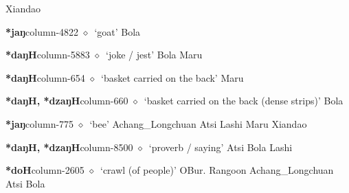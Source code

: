 \hspace{1ex}
         Xiandao 
  \item {\footnotesize \textbf{*jaŋ}}{\tiny column-4822}
         $\diamond$~`goat'
         Bola 
  \item {\footnotesize \textbf{*daŋH}}{\tiny column-5883}
         $\diamond$~`joke / jest'
         Bola 
\hspace{1ex}
         Maru 
  \item {\footnotesize \textbf{*daŋH}}{\tiny column-654}
         $\diamond$~`basket carried on the back'
         Maru 
  \item {\footnotesize \textbf{*daŋH, *dzaŋH}}{\tiny column-660}
         $\diamond$~`basket carried on the back (dense strips)'
         Bola 
  \item {\footnotesize \textbf{*jaŋ}}{\tiny column-775}
         $\diamond$~`bee'
         Achang\_Longchuan 
\hspace{1ex}
         Atsi 
\hspace{1ex}
         Lashi 
\hspace{1ex}
         Maru 
\hspace{1ex}
         Xiandao 
  \item {\footnotesize \textbf{*daŋH, *dzaŋH}}{\tiny column-8500}
         $\diamond$~`proverb / saying'
         Atsi 
\hspace{1ex}
         Bola 
\hspace{1ex}
         Lashi 
  \item {\footnotesize \textbf{*doH}}{\tiny column-2605}
         $\diamond$~`crawl (of people)'
         OBur. 
\hspace{1ex}
         Rangoon 
\hspace{1ex}
         Achang\_Longchuan 
\hspace{1ex}
         Atsi 
\hspace{1ex}
         Bola 
